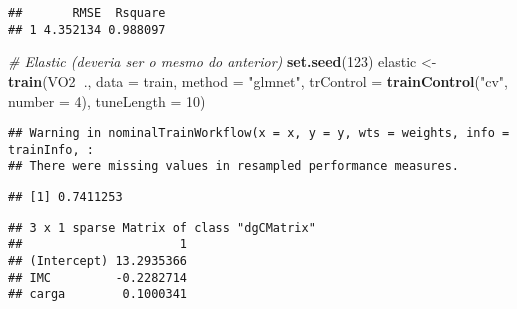 \documentclass[]{article}
\newenvironment{Shaded}{\begin{snugshade}}{\end{snugshade}}
\newcommand{\CommentTok}[1]{\textcolor[rgb]{0.56,0.35,0.01}{\textit{#1}}}
\newcommand{\DataTypeTok}[1]{\textcolor[rgb]{0.13,0.29,0.53}{#1}}
\newcommand{\DecValTok}[1]{\textcolor[rgb]{0.00,0.00,0.81}{#1}}
\newcommand{\KeywordTok}[1]{\textcolor[rgb]{0.13,0.29,0.53}{\textbf{#1}}}
\newcommand{\NormalTok}[1]{#1}
\newcommand{\OperatorTok}[1]{\textcolor[rgb]{0.81,0.36,0.00}{\textbf{#1}}}
\newcommand{\StringTok}[1]{\textcolor[rgb]{0.31,0.60,0.02}{#1}}
\begin{document}
\begin{verbatim}
##       RMSE  Rsquare
## 1 4.352134 0.988097
\end{verbatim}

\begin{Shaded}
\begin{Highlighting}[]
\CommentTok{# Elastic (deveria ser o mesmo do anterior)}
\KeywordTok{set.seed}\NormalTok{(}\DecValTok{123}\NormalTok{)}
\NormalTok{elastic <-}\StringTok{ }\KeywordTok{train}\NormalTok{(VO2}\OperatorTok{~}\NormalTok{., }\DataTypeTok{data =}\NormalTok{ train, }\DataTypeTok{method =} \StringTok{"glmnet"}\NormalTok{, }\DataTypeTok{trControl =} \KeywordTok{trainControl}\NormalTok{(}\StringTok{"cv"}\NormalTok{, }\DataTypeTok{number =} \DecValTok{4}\NormalTok{), }\DataTypeTok{tuneLength =} \DecValTok{10}\NormalTok{)}
\end{Highlighting}
\end{Shaded}

\begin{verbatim}
## Warning in nominalTrainWorkflow(x = x, y = y, wts = weights, info = trainInfo, :
## There were missing values in resampled performance measures.
\end{verbatim}

\begin{Shaded}
\end{Shaded}

\begin{verbatim}
## [1] 0.7411253
\end{verbatim}

\begin{Shaded}
\end{Shaded}

\begin{verbatim}
## 3 x 1 sparse Matrix of class "dgCMatrix"
##                      1
## (Intercept) 13.2935366
## IMC         -0.2282714
## carga        0.1000341
\end{verbatim}

\begin{Shaded}
\end{Shaded}
\end{document}
